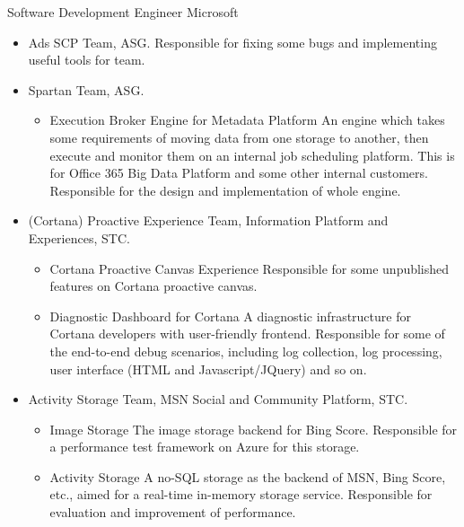 \documentclass[10pt,a4paper,roman]{moderncv} %
\begin{document}
        {Software Development Engineer}
        {}
        {Microsoft}
        {}
        {\begin{itemize}%
         \item Ads SCP Team, ASG.
               Responsible for fixing some bugs and implementing useful tools for team.
         \item Spartan Team, ASG.
               \begin{itemize}%
               \item Execution Broker Engine for Metadata Platform\newline{}%
                     An engine which takes some requirements of moving data from one storage to another, then execute and monitor them on an internal job scheduling platform. This is for Office 365 Big Data Platform and some other internal customers.\newline{}%
                     Responsible for the design and implementation of whole engine.
               \end{itemize}
         \item (Cortana) Proactive Experience Team, Information Platform and Experiences, STC.
               \begin{itemize}%
               \item Cortana Proactive Canvas Experience\newline{}%
                     Responsible for some unpublished features on Cortana proactive canvas.
               \item Diagnostic Dashboard for Cortana\newline{}%
                     A diagnostic infrastructure for Cortana developers with user-friendly frontend.\newline{}%
                     Responsible for some of the end-to-end debug scenarios, including log collection, log processing, user interface (HTML and Javascript/JQuery) and so on.
               \end{itemize}
         \item Activity Storage Team, MSN Social and Community Platform, STC.
               \begin{itemize}%
               \item Image Storage\newline{}%
                     The image storage backend for Bing Score.\newline{}%
                     Responsible for a performance test framework on Azure for this storage.
               \item Activity Storage\newline{}%
                     A no-SQL storage as the backend of MSN, Bing Score, etc., aimed for a real-time in-memory storage service.\newline{}%
                     Responsible for evaluation and improvement of performance.
               \end{itemize}
         \end{itemize}}
\end{document}
